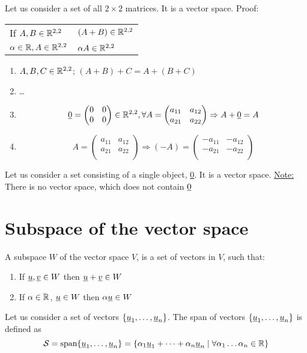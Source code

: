 \begin{example}
Let us consider a set of all $2\times 2$ matrices. It is a vector space. Proof:
\begin{tabular}{l l}
If $A,B\in\mathbb{R}^{2,2}$ & $(A+B)\in\mathbb{R}^{2,2}$\\
$\alpha\in\mathbb{R}, A\in\mathbb{R}^{2,2}$ & $\alpha A \in \mathbb{R}^{2,2}$
\end{tabular}
\begin{enumerate}
\item $A,B,C\in\mathbb{R}^{2,2}$; $(A+B)+C = A+(B+C)$
\item \dots 
\item \[
\underline{0} = \begin{pmatrix}
0 & 0\\
0 & 0
\end{pmatrix}\in \mathbb{R}^{2,2}, \forall A = \begin{pmatrix}
a_{11} & a_{12}\\
a_{21} & a_{22}\\
\end{pmatrix} \Rightarrow A+\underline{0} = A
\]
\item \[
A = \begin{pmatrix}
a_{11} & a_{12}\\
a_{21} & a_{22}\\
\end{pmatrix}\Rightarrow (-A) = \begin{pmatrix}
-a_{11} & -a_{12}\\
-a_{21} & -a_{22}\\
\end{pmatrix}
\]
\end{enumerate}
\end{example}
\begin{example}
Let us consider a set consisting of a single object, \ul{0}. It is a vector space. \underline{Note:} There is no vector space, which does not contain $\underline{0}$
\end{example}

\section{Subspace of the vector space}
\begin{definition}
A subspace $W$ of the vector space $V$, is a set of vectors in $V$, such that:
\begin{enumerate}
	\item If $\underline{u},\underline{v}\in W$ then $\underline{u}+\underline{v}\in W$
\item If $\alpha \in\mathbb{R}$, $\underline{u}\in W$ then $\alpha \underline{u}\in W$
\end{enumerate}
\end{definition}
\begin{definition}
Let us consider a set of vectors $\{ \underline{u}_1,\dots,\underline{u}_n \}$. The span of vectors $\{ \underline{u}_1,\dots,\underline{u}_n \}$ is defined as
\[ \mathcal{S} = \text{span}\{\underline{u}_1,\dots,\underline{u}_n\} = \{\alpha_1\underline{u}_1+\dots+\alpha_n\underline{u}_n\mid \forall\alpha_1\dots\alpha_n\in\mathbb{R}\}\]
\end{definition}





